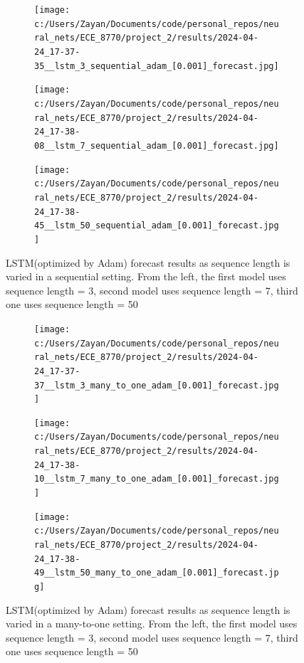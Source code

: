 \documentclass[12pt, letterpaper]{article}
\begin{document}
\begin{figure}[htpb]
    \centering
    \begin{subfigure}[b]{0.3\textwidth}
        \texttt{[image: c:/Users/Zayan/Documents/code/personal\_repos/neural\_nets/ECE\_8770/project\_2/results/2024-04-24\_17-37-35\_\_lstm\_3\_sequential\_adam\_[0.001]\_forecast.jpg]}
    \end{subfigure}
    \begin{subfigure}[b]{0.3\textwidth}
        \texttt{[image: c:/Users/Zayan/Documents/code/personal\_repos/neural\_nets/ECE\_8770/project\_2/results/2024-04-24\_17-38-08\_\_lstm\_7\_sequential\_adam\_[0.001]\_forecast.jpg]}
    \end{subfigure}
    \begin{subfigure}[b]{0.3\textwidth}
        \texttt{[image: c:/Users/Zayan/Documents/code/personal\_repos/neural\_nets/ECE\_8770/project\_2/results/2024-04-24\_17-38-45\_\_lstm\_50\_sequential\_adam\_[0.001]\_forecast.jpg]}
    \end{subfigure}
    \caption{LSTM(optimized by Adam) forecast results as sequence length is varied in a sequential setting. From 
    the left, the first model uses sequence length = 3, second model uses sequence length = 7, third one uses sequence length = 50}
    \label{fig: Adam-LSTM forecast results as sequence length is varied in a sequential setting}
\end{figure}

\begin{figure}[htpb]
    \centering
    \begin{subfigure}[b]{0.3\textwidth}
        \texttt{[image: c:/Users/Zayan/Documents/code/personal\_repos/neural\_nets/ECE\_8770/project\_2/results/2024-04-24\_17-37-37\_\_lstm\_3\_many\_to\_one\_adam\_[0.001]\_forecast.jpg]}
    \end{subfigure}
    \begin{subfigure}[b]{0.3\textwidth}
        \texttt{[image: c:/Users/Zayan/Documents/code/personal\_repos/neural\_nets/ECE\_8770/project\_2/results/2024-04-24\_17-38-10\_\_lstm\_7\_many\_to\_one\_adam\_[0.001]\_forecast.jpg]}
    \end{subfigure}
    \begin{subfigure}[b]{0.3\textwidth}
        \texttt{[image: c:/Users/Zayan/Documents/code/personal\_repos/neural\_nets/ECE\_8770/project\_2/results/2024-04-24\_17-38-49\_\_lstm\_50\_many\_to\_one\_adam\_[0.001]\_forecast.jpg]}
    \end{subfigure}
    \caption{LSTM(optimized by Adam) forecast results as sequence length is varied in a many-to-one setting. From 
    the left, the first model uses sequence length = 3, second model uses sequence length = 7, third one uses sequence length = 50}
    \label{fig: Adam-LSTM forecast results as sequence length is varied in a many-to-one setting}
\end{figure}
\end{document}
